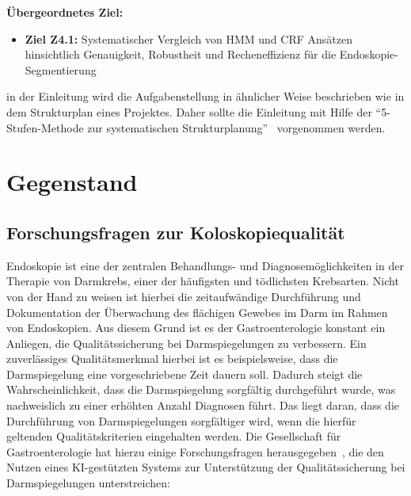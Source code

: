 \textbf{Übergeordnetes Ziel:}
\begin{itemize}
\item \textbf{Ziel Z4.1:} Systematischer Vergleich von HMM und CRF Ansätzen hinsichtlich Genauigkeit, Robustheit und Recheneffizienz für die Endoskopie-Segmentierung
\end{itemize} in der Einleitung wird die Aufgabenstellung in ähnlicher Weise beschrieben wie in dem Strukturplan eines Projektes.
Daher sollte die Einleitung mit Hilfe der \enquote{5-Stufen-Methode zur systematischen Strukturplanung}~\citep{ob}\footnotemark{} vorgenommen werden.

\section{Gegenstand}


\subsection{Forschungsfragen zur Koloskopiequalität}

Endoskopie ist eine der zentralen Behandlungs- und Diagnosemöglichkeiten in der Therapie von Darmkrebs, 
einer der häufigsten und tödlichsten Krebsarten.\citep{labianca2010-colon-cancer}\footnotemark{} 
Nicht von der Hand zu weisen ist hierbei die zeitaufwändige Durchführung und 
Dokumentation der Überwachung des flächigen Gewebes im Darm im Rahmen von Endoskopien. Aus diesem Grund ist es 
der Gastroenterologie konstant ein Anliegen, die Qualitätssicherung bei Darmspiegelungen zu verbessern. 
Ein zuverlässiges Qualitätsmerkmal hierbei ist es beispielsweise, dass die Darmspiegelung eine vorgeschriebene Zeit dauern soll. 
Dadurch steigt die Wahrscheinlichkeit, dass die Darmspiegelung sorgfältig durchgeführt wurde, was nachweislich zu einer 
erhöhten Anzahl Diagnosen führt. Das liegt daran, dass die Durchführung von Darmspiegelungen sorgfältiger wird, 
wenn die hierfür geltenden Qualitätskriterien eingehalten werden. Die Gesellschaft für Gastroenterologie hat hierzu einige Forschungsfragen herausgegeben~\citep{kaminski_performance_2017}, die den Nutzen eines KI-gestützten Systems zur Unterstützung der Qualitätssicherung bei Darmspiegelungen unterstreichen:

